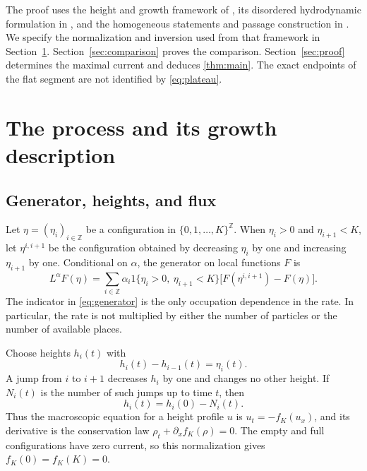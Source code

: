 \documentclass[11pt]{amsart}
\theoremstyle{remark}
\newcommand{\ZZ}{\mathbb Z}
\numberwithin{equation}{section}
\begin{document}
The proof uses the height and growth framework of \cite{SeppHydro}, its
disordered hydrodynamic formulation in \cite{SeppSurvey}, and the
homogeneous statements and passage construction in \cite{SeppNotes}.
We specify the normalization and inversion used from that framework in
Section~\ref{sec:prelim}. Section~\ref{sec:comparison} proves the
comparison. Section~\ref{sec:proof} determines the maximal current and
deduces \cref{thm:main}. The exact endpoints of the flat segment are not
identified by \eqref{eq:plateau}.

\section{The process and its growth description}\label{sec:prelim}

\subsection{Generator, heights, and flux}
Let $\eta=(\eta_i)_{i\in\ZZ}$ be a configuration in
$\{0,1,\ldots,K\}^{\ZZ}$. When $\eta_i>0$ and $\eta_{i+1}<K$, let
$\eta^{i,i+1}$ be the configuration obtained by decreasing $\eta_i$ by
one and increasing $\eta_{i+1}$ by one. Conditional on $\alpha$, the
generator on local functions $F$ is
\begin{equation}\label{eq:generator}
 L^\alpha F(\eta)=\sum_{i\in\ZZ}\alpha_i
 \mathrm{1}\{\eta_i>0,\ \eta_{i+1}<K\}
 \bigl[F(\eta^{i,i+1})-F(\eta)\bigr].
\end{equation}
The indicator in \eqref{eq:generator} is the only occupation dependence
in the rate. In particular, the rate is not multiplied by either the
number of particles or the number of available places.

Choose heights $h_i(t)$ with
\begin{equation}\label{eq:height}
 h_i(t)-h_{i-1}(t)=\eta_i(t).
\end{equation}
A jump from $i$ to $i+1$ decreases $h_i$ by one and changes no other
height. If $N_i(t)$ is the number of such jumps up to time $t$, then
\begin{equation}\label{eq:current-normalization}
 h_i(t)=h_i(0)-N_i(t).
\end{equation}
Thus the macroscopic equation for a height profile $u$ is
$u_t=-f_K(u_x)$, and its derivative is the conservation law
$\rho_t+\partial_x f_K(\rho)=0$. The empty and full configurations have
zero current, so this normalization gives $f_K(0)=f_K(K)=0$.
\end{document}
